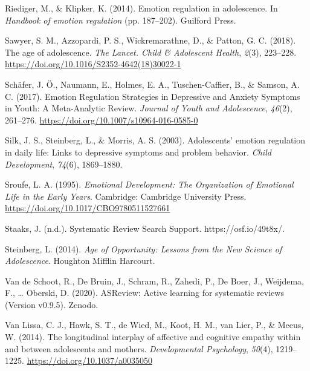 \documentclass[
  english,
  man]{apa6}
\begin{document}
\leavevmode\hypertarget{ref-riedigerEmotionRegulationAdolescence2014}{}%
Riediger, M., \& Klipker, K. (2014). Emotion regulation in adolescence. In \emph{Handbook of emotion regulation} (pp. 187--202). Guilford Press.

\leavevmode\hypertarget{ref-sawyerAgeAdolescence2018}{}%
Sawyer, S. M., Azzopardi, P. S., Wickremarathne, D., \& Patton, G. C. (2018). The age of adolescence. \emph{The Lancet. Child \& Adolescent Health}, \emph{2}(3), 223--228. \url{https://doi.org/10.1016/S2352-4642(18)30022-1}

\leavevmode\hypertarget{ref-schaferEmotionRegulationStrategies2017}{}%
Schäfer, J. Ö., Naumann, E., Holmes, E. A., Tuschen-Caffier, B., \& Samson, A. C. (2017). Emotion Regulation Strategies in Depressive and Anxiety Symptoms in Youth: A Meta-Analytic Review. \emph{Journal of Youth and Adolescence}, \emph{46}(2), 261--276. \url{https://doi.org/10.1007/s10964-016-0585-0}

\leavevmode\hypertarget{ref-silkAdolescentsEmotionRegulation2003}{}%
Silk, J. S., Steinberg, L., \& Morris, A. S. (2003). Adolescents' emotion regulation in daily life: Links to depressive symptoms and problem behavior. \emph{Child Development}, \emph{74}(6), 1869--1880.

\leavevmode\hypertarget{ref-sroufeEmotionalDevelopmentOrganization1995}{}%
Sroufe, L. A. (1995). \emph{Emotional Development: The Organization of Emotional Life in the Early Years}. Cambridge: Cambridge University Press. \url{https://doi.org/10.1017/CBO9780511527661}

\leavevmode\hypertarget{ref-staaksSystematicReviewSearch}{}%
Staaks, J. (n.d.). Systematic Review Search Support. https://osf.io/49t8x/.

\leavevmode\hypertarget{ref-steinbergAgeOpportunityLessons2014}{}%
Steinberg, L. (2014). \emph{Age of Opportunity: Lessons from the New Science of Adolescence}. Houghton Mifflin Harcourt.

\leavevmode\hypertarget{ref-van_de_schoot_rens_2020_3828293}{}%
Van de Schoot, R., De Bruin, J., Schram, R., Zahedi, P., De Boer, J., Weijdema, F., \ldots{} Oberski, D. (2020). ASReview: Active learning for systematic reviews (Version v0.9.5). Zenodo.

\leavevmode\hypertarget{ref-vanlissaLongitudinalInterplayAffective2014}{}%
Van Lissa, C. J., Hawk, S. T., de Wied, M., Koot, H. M., van Lier, P., \& Meeus, W. (2014). The longitudinal interplay of affective and cognitive empathy within and between adolescents and mothers. \emph{Developmental Psychology}, \emph{50}(4), 1219--1225. \url{https://doi.org/10.1037/a0035050}
\end{document}
